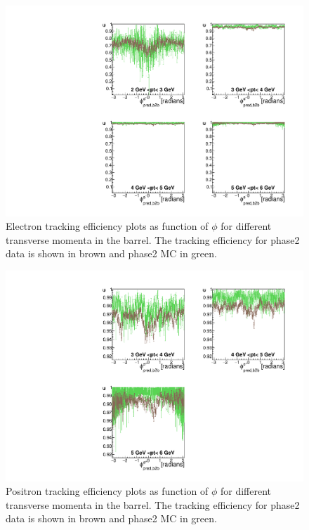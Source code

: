 \documentclass[a4paper,11pt,twosided,final,german,openbib,pdftex,listof=totoc,bibliography=totoc]{scrbook}
\begin{document}
\begin{figure}[!htbp]
	\centering
	\includegraphics[width=\textwidth]{Plots/master/xPtMPhiemBarrel}
	\caption[Transverse Momentum $\phi$ Electron Barrel Efficiency Phase2]{Electron tracking efficiency plots as function of $\phi$ for different transverse momenta in the barrel. The tracking efficiency for phase2 data is shown in brown and phase2 MC in green.
	\label{plt:xPtMPhiemBarrel}	}
\end{figure}

\begin{figure}[!htbp]
	\centering
	\includegraphics[width=\textwidth]{Plots/master/xPtMPhiepBarrel}
	\caption[Transverse Momentum $\phi$ Positron Barrel Efficiency Phase2]{Positron tracking efficiency plots as function of $\phi$ for different transverse momenta in the barrel. The tracking efficiency for phase2 data is shown in brown and phase2 MC in green.
		\label{plt:xPtMPhiepBarrel}	}
\end{figure}
\end{document}
